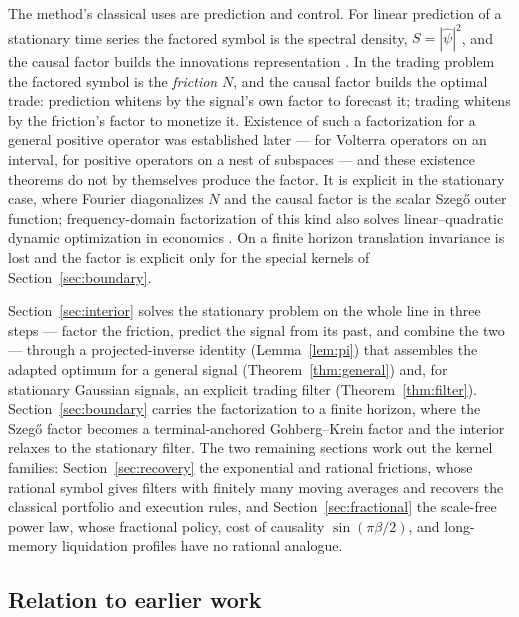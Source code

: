 \documentclass[11pt]{article}
\theoremstyle{plain}
\theoremstyle{definition}
\theoremstyle{remark}
\begin{document}
The method's classical uses are prediction and control. For linear prediction of a stationary time series the factored symbol is the spectral density, $S=|\hat\psi|^2$, and the causal factor builds the innovations representation \citep{Wiener1949,Whittle1963}. In the trading problem the factored symbol is the \emph{friction} $N$, and the causal factor builds the optimal trade: prediction whitens by the signal's own factor to forecast it; trading whitens by the friction's factor to monetize it. Existence of such a factorization for a general positive operator was established later --- \citet{GohbergKrein1970} for Volterra operators on an interval, \citet{Arveson1975} for positive operators on a nest of subspaces --- and these existence theorems do not by themselves produce the factor. It is explicit in the stationary case, where Fourier diagonalizes $N$ and the causal factor is the scalar Szeg\H{o} outer function; frequency-domain factorization of this kind also solves linear--quadratic dynamic optimization in economics \citep{Whiteman1985}. On a finite horizon translation invariance is lost and the factor is explicit only for the special kernels of Section~\ref{sec:boundary}.

Section~\ref{sec:interior} solves the stationary problem on the whole line in three steps --- factor the friction, predict the signal from its past, and combine the two --- through a projected-inverse identity (Lemma~\ref{lem:pi}) that assembles the adapted optimum for a general signal (Theorem~\ref{thm:general}) and, for stationary Gaussian signals, an explicit trading filter (Theorem~\ref{thm:filter}). Section~\ref{sec:boundary} carries the factorization to a finite horizon, where the Szeg\H{o} factor becomes a terminal-anchored Gohberg--Krein factor and the interior relaxes to the stationary filter. The two remaining sections work out the kernel families: Section~\ref{sec:recovery} the exponential and rational frictions, whose rational symbol gives filters with finitely many moving averages and recovers the classical portfolio and execution rules, and Section~\ref{sec:fractional} the scale-free power law, whose fractional policy, cost of causality $\sin(\pi\beta/2)$, and long-memory liquidation profiles have no rational analogue.

\subsection{Relation to earlier work}\label{sec:relatedwork}
\end{document}
